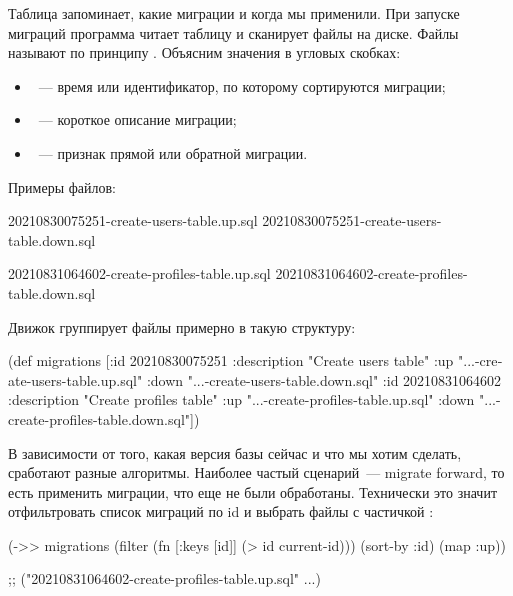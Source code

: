 Таблица запоминает, какие миграции и когда мы применили. При запуске миграций программа читает таблицу и сканирует файлы на диске. Файлы называют по принципу . Объясним значения в угловых скобках:

\begin{itemize}

\item
  ~--- время или идентификатор, по которому сортируются миграции;

\item
  ~--- короткое описание миграции;

\item
  ~--- признак прямой или обратной миграции.

\end{itemize}

Примеры файлов:

\begin{english}
  \begin{text}
20210830075251-create-users-table.up.sql
20210830075251-create-users-table.down.sql

20210831064602-create-profiles-table.up.sql
20210831064602-create-profiles-table.down.sql
  \end{text}
\end{english}

Движок группирует файлы примерно в такую структуру:

\begin{english}
  \begin{clojure}
(def migrations
  [{:id 20210830075251
    :description "Create users table"
    :up "...-create-users-table.up.sql"
    :down "...-create-users-table.down.sql"}
   {:id 20210831064602
    :description "Create profiles table"
    :up "...-create-profiles-table.up.sql"
    :down "...-create-profiles-table.down.sql"}])
  \end{clojure}
\end{english}

В зависимости от того, какая версия базы сейчас и что мы хотим сделать, сработают разные алгоритмы. Наиболее частый сценарий~--- migrate forward, то есть применить миграции, что еще не были обработаны. Технически это значит отфильтровать список миграций по id и выбрать файлы с частичкой :

\begin{english}
  \begin{clojure}
(->> migrations
     (filter (fn [{:keys [id]}]
               (> id current-id)))
     (sort-by :id)
     (map :up))

;; ("20210831064602-create-profiles-table.up.sql" ...)
  \end{clojure}
\end{english}

